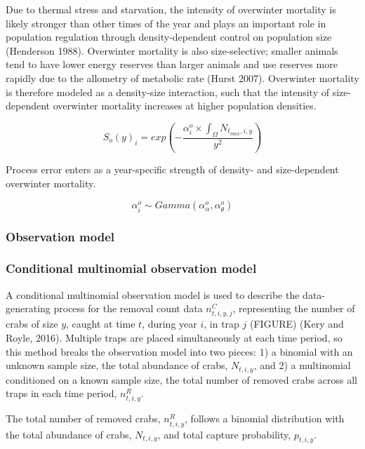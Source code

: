 \documentclass{article}
\begin{document}
Due to thermal stress and starvation, the intensity of overwinter mortality is likely stronger than other times of the year and plays an important role in population regulation through density-dependent control on population size (Henderson 1988). Overwinter mortality is also size-selective; smaller animals tend to have lower energy reserves than larger animals and use reserves more rapidly due to the allometry of metabolic rate (Hurst 2007). Overwinter mortality is therefore modeled as a density-size interaction, such that the intensity of size-dependent overwinter mortality increases at higher population densities. 

\begin{equation}
S_o(y)_i = exp(-\frac{\alpha_i^o \times \int_{\Omega}N_{t_{max},i,y}}{y^2})
\end{equation}

Process error enters as a year-specific strength of density- and size-dependent overwinter mortality.

\begin{equation}
\alpha^o_i \sim Gamma(\alpha^o_{\alpha}, \alpha^o_{\theta})
\end{equation}

\subsubsection{Observation model}

\subsubsection*{Conditional multinomial observation model}

A conditional multinomial observation model is used to describe the data-generating process for the removal count data $n^C_{t,i,y,j}$, representing the number of crabs of size $y$, caught at time $t$, during year $i$, in trap $j$ (FIGURE) (Kery and Royle, 2016). Multiple traps are placed simultaneously at each time period, so this method breaks the observation model into two pieces: 1) a binomial with an unknown sample size, the total abundance of crabs, $N_{t,i,y}$, and 2) a multinomial conditioned on a known sample size, the total number of removed crabs across all traps in each time period, $n^R_{t,i,y}$.

The total number of removed crabs, $n^R_{t,i,y}$, follows a binomial distribution with the total abundance of crabs, $N_{t,i,y}$, and total capture probability, $p_{t,i,y}$.
\end{document}
